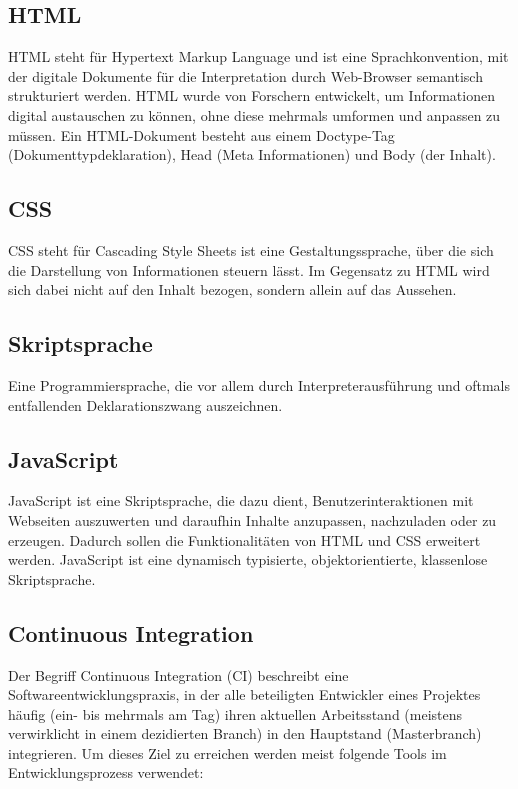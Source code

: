     \subsection{HTML}
    HTML steht für Hypertext Markup Language und ist eine Sprachkonvention, mit 
    der digitale Dokumente für die Interpretation durch Web-Browser semantisch 
    strukturiert werden. HTML wurde von Forschern entwickelt, um Informationen 
    digital austauschen zu können, ohne diese mehrmals umformen und anpassen zu 
    müssen. Ein HTML-Dokument besteht aus einem Doctype-Tag 
    (Dokumenttypdeklaration), Head 
    (Meta Informationen) und Body (der Inhalt).

    \subsection{CSS}
    CSS steht für Cascading Style Sheets ist eine Gestaltungssprache, über die 
    sich die Darstellung von Informationen steuern lässt. Im Gegensatz zu HTML 
    wird sich dabei nicht auf den Inhalt bezogen, sondern allein auf das Aussehen.

    \subsection{Skriptsprache}
    Eine Programmiersprache, die vor allem durch Interpreterausführung und oftmals 
    entfallenden Deklarationszwang auszeichnen.


    \subsection{JavaScript}
    JavaScript ist eine Skriptsprache, die dazu dient, Benutzerinteraktionen mit 
    Webseiten auszuwerten und daraufhin Inhalte anzupassen, nachzuladen oder zu 
    erzeugen. Dadurch sollen die Funktionalitäten von HTML und CSS erweitert 
    werden. JavaScript ist eine dynamisch typisierte, objektorientierte, 
    klassenlose Skriptsprache.

    \subsection{Continuous Integration}
    Der Begriff Continuous Integration (CI) beschreibt eine Softwareentwicklungspraxis,
    in der alle beteiligten Entwickler eines Projektes häufig (ein- bis mehrmals am 
    Tag) ihren aktuellen Arbeitsstand (meistens verwirklicht in einem dezidierten 
    Branch) in den Hauptstand (Masterbranch)
    integrieren. Um dieses Ziel zu erreichen werden meist folgende Tools im 
    Entwicklungsprozess verwendet:

